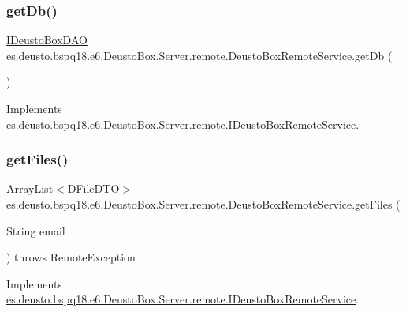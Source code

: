 \subsubsection{\texorpdfstring{get\+Db()}{getDb()}}
{\footnotesize\ttfamily \mbox{\hyperlink{interfacees_1_1deusto_1_1bspq18_1_1e6_1_1_deusto_box_1_1_server_1_1jdo_1_1dao_1_1_i_deusto_box_d_a_o}{I\+Deusto\+Box\+D\+AO}} es.\+deusto.\+bspq18.\+e6.\+Deusto\+Box.\+Server.\+remote.\+Deusto\+Box\+Remote\+Service.\+get\+Db (\begin{DoxyParamCaption}{ }\end{DoxyParamCaption})}



Implements \mbox{\hyperlink{interfacees_1_1deusto_1_1bspq18_1_1e6_1_1_deusto_box_1_1_server_1_1remote_1_1_i_deusto_box_remote_service_ac9d6749c6cebd4a9362975e1e3def1d8}{es.\+deusto.\+bspq18.\+e6.\+Deusto\+Box.\+Server.\+remote.\+I\+Deusto\+Box\+Remote\+Service}}.

\mbox{\label{classes_1_1deusto_1_1bspq18_1_1e6_1_1_deusto_box_1_1_server_1_1remote_1_1_deusto_box_remote_service_a08c60cb9bff7018bf484c7f721f71d0c}} 
\subsubsection{\texorpdfstring{get\+Files()}{getFiles()}}
{\footnotesize\ttfamily Array\+List$<$\mbox{\hyperlink{classes_1_1deusto_1_1bspq18_1_1e6_1_1_deusto_box_1_1_server_1_1dto_1_1_d_file_d_t_o}{D\+File\+D\+TO}}$>$ es.\+deusto.\+bspq18.\+e6.\+Deusto\+Box.\+Server.\+remote.\+Deusto\+Box\+Remote\+Service.\+get\+Files (\begin{DoxyParamCaption}\item[{String}]{email }\end{DoxyParamCaption}) throws Remote\+Exception}



Implements \mbox{\hyperlink{interfacees_1_1deusto_1_1bspq18_1_1e6_1_1_deusto_box_1_1_server_1_1remote_1_1_i_deusto_box_remote_service_a53d2f238c6a092b1f873cd40a70a830d}{es.\+deusto.\+bspq18.\+e6.\+Deusto\+Box.\+Server.\+remote.\+I\+Deusto\+Box\+Remote\+Service}}.

